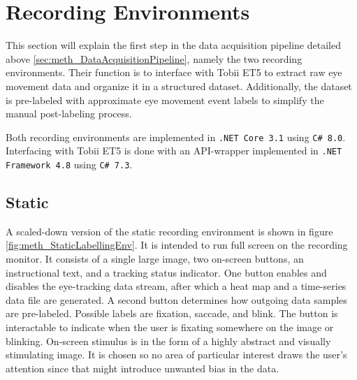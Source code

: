 \section{Recording Environments} \label{sec:meth_RecordingEnvironments}

This section will explain the first step in the data acquisition pipeline detailed above \ref{sec:meth_DataAcquisitionPipeline}, namely the two recording environments. Their function is to interface with Tobii ET5 to extract raw eye movement data and organize it in a structured dataset. Additionally, the dataset is pre-labeled with approximate eye movement event labels to simplify the manual post-labeling process.

Both recording environments are implemented in \texttt{.NET Core 3.1} using \texttt{C\# 8.0}. Interfacing with Tobii ET5 is done with an API-wrapper implemented in \texttt{.NET Framework 4.8} using \texttt{C\# 7.3}.



\subsection{Static}

A scaled-down version of the static recording environment is shown in figure \ref{fig:meth_StaticLabellingEnv}. It is intended to run full screen on the recording monitor. It consists of a single large image, two on-screen buttons, an instructional text, and a tracking status indicator. One button enables and disables the eye-tracking data stream, after which a heat map and a time-series data file are generated. A second button determines how outgoing data samples are pre-labeled. Possible labels are fixation, saccade, and blink. The button is interactable to indicate when the user is fixating somewhere on the image or blinking. On-screen stimulus is in the form of a highly abstract and visually stimulating image. It is chosen so no area of particular interest draws the user's attention since that might introduce unwanted bias in the data.

